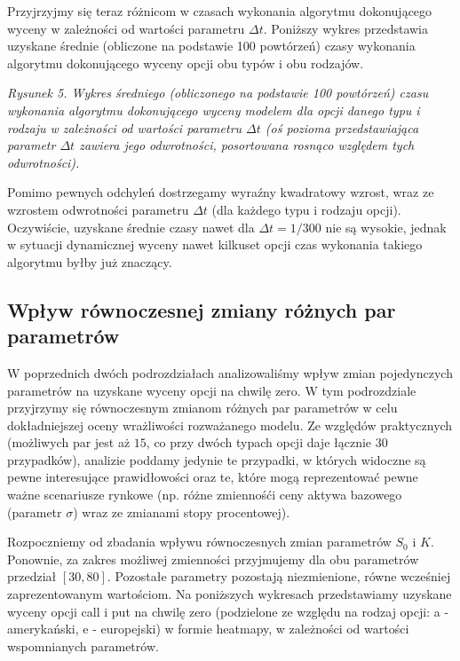 \documentclass[
]{article}
\begin{document}
Przyjrzyjmy się teraz różnicom w czasach wykonania algorytmu
dokonującego wyceny w zależności od wartości parametru \(\Delta t\).
Poniższy wykres przedstawia uzyskane średnie (obliczone na podstawie 100
powtórzeń) czasy wykonania algorytmu dokonującego wyceny opcji obu typów
i obu rodzajów.

\emph{Rysunek 5. Wykres średniego (obliczonego na podstawie 100
powtórzeń) czasu wykonania algorytmu dokonującego wyceny modelem dla
opcji danego typu i rodzaju w zależności od wartości parametru
\(\Delta t\) (oś pozioma przedstawiająca parametr \(\Delta t\) zawiera
jego odwrotności, posortowana rosnąco względem tych odwrotności).}

Pomimo pewnych odchyleń dostrzegamy wyraźny kwadratowy wzrost, wraz ze
wzrostem odwrotności parametru \(\Delta t\) (dla każdego typu i rodzaju
opcji). Oczywiście, uzyskane średnie czasy nawet dla
\(\Delta t = 1/300\) nie są wysokie, jednak w sytuacji dynamicznej
wyceny nawet kilkuset opcji czas wykonania takiego algorytmu byłby już
znaczący.

\hypertarget{wpux142yw-ruxf3wnoczesnej-zmiany-ruxf3ux17cnych-par-parametruxf3w}{%
\subsection{Wpływ równoczesnej zmiany różnych par
parametrów}\label{wpux142yw-ruxf3wnoczesnej-zmiany-ruxf3ux17cnych-par-parametruxf3w}}

W poprzednich dwóch podrozdziałach analizowaliśmy wpływ zmian
pojedynczych parametrów na uzyskane wyceny opcji na chwilę zero. W tym
podrozdziale przyjrzymy się równoczesnym zmianom różnych par parametrów
w celu dokładniejszej oceny wrażliwości rozważanego modelu. Ze względów
praktycznych (możliwych par jest aż \(15\), co przy dwóch typach opcji
daje łącznie 30 przypadków), analizie poddamy jedynie te przypadki, w
których widoczne są pewne interesujące prawidłowości oraz te, które mogą
reprezentować pewne ważne scenariusze rynkowe (np. różne zmiennośći ceny
aktywa bazowego (parametr \(\sigma\)) wraz ze zmianami stopy
procentowej).

Rozpoczniemy od zbadania wpływu równoczesnych zmian parametrów \(S_0\) i
\(K\). Ponownie, za zakres możliwej zmienności przyjmujemy dla obu
parametrów przedział \([30, 80]\). Pozostałe parametry pozostają
niezmienione, równe wcześniej zaprezentowanym wartościom. Na poniższych
wykresach przedstawiamy uzyskane wyceny opcji call i put na chwilę zero
(podzielone ze względu na rodzaj opcji: a - amerykański, e - europejski)
w formie heatmapy, w zależności od wartości wspomnianych parametrów.
\end{document}
